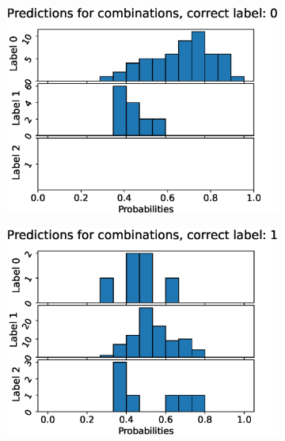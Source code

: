 
\begin{figure}
  \centering
  \begin{subfigure}[t]{0.33\textwidth}
    \includegraphics[width=\textwidth]{files/figs/res/femval/pc0.eps}
    \caption{}
    \label{fig:femval-pc0}
  \end{subfigure}%
  \begin{subfigure}[t]{0.33\textwidth}
    \includegraphics[width=\textwidth]{files/figs/res/femval/pc1.eps}
    \caption{}
    \label{fig:femval-pc1}
  \end{subfigure}%
  \begin{subfigure}[t]{0.33\textwidth}

\end{subfigure}
\end{figure}
